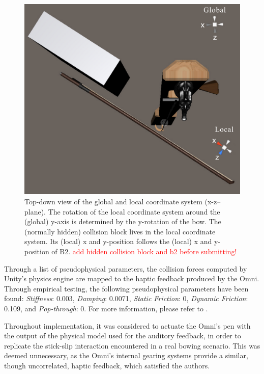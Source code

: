 \documentclass[dvipsnames, pdftex]{article}
\def\SWcomment[#1]{\textcolor{Red}{#1}}
\begin{document}
\begin{figure}[t]\includegraphics[width=1.0\columnwidth]{SMC 2020 paper template LaTeX/figures/globalLocal.pdf}
\centering
  \caption{Top-down view of the global and local coordinate system (x-z--plane). The rotation of the local coordinate system around the (global) y-axis is determined by the y-rotation of the bow. The (normally hidden) collision block lives in the local coordinate system. Its (local) x and y-position follows the (local) x and y-position of B2. \SWcomment[add hidden collision block and b2 before submitting!]\label{fig:localGlobal}}
\end{figure}
Through a list of pseudophysical parameters, the collision forces computed by Unity's physics engine are mapped to the haptic feedback produced by the Omni. Through empirical testing, the following pseudophysical parameters have been found: \textit{Stiffness}: 0.003, \textit{Damping}: 0.0071, \textit{Static Friction}: 0, \textit{Dynamic Friction}: 0.109, and \textit{Pop-through}: 0. For more information, please refer to \cite{OmniAPI2018}.

Throughout implementation, it was considered to actuate the Omni's pen with the output of the physical model used for the auditory feedback, in order to replicate the stick-slip interaction encountered in a real bowing scenario. This was deemed unnecessary, as the Omni's internal gearing systems provide a similar, though uncorrelated, haptic feedback, which satisfied the authors.
\end{document}
